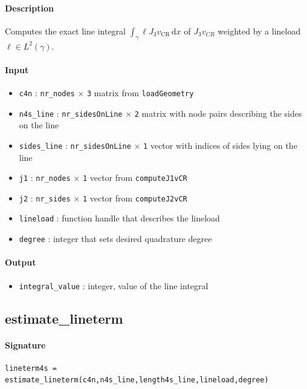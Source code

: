 \documentclass[11pt,a4paper]{article}
\newcommand{\vCR}{v_{\mathrm{CR}}}
\newcommand{\dx}{\,\mathrm{d}x}
\newcommand{\matrixdim}[2]{\texttt{#1} $\times$ \texttt{#2}}
\begin{document}
\paragraph{Description}
Computes the exact line integral \(\int_\gamma \ell J_3 \vCR \dx \) of $J_3 v_{CR}$ weighted by a lineload \(\ell \in L^2(\gamma)\).

\paragraph{Input}
\begin{itemize}
    \item \texttt{c4n} : \texttt{nr\_nodes} \(\times\) \texttt{3} matrix from \texttt{loadGeometry}
    \item \texttt{n4s\_line} : \texttt{nr\_sidesOnLine} \(\times\) \texttt{2} matrix with node pairs describing the sides on the line
    \item \texttt{sides\_line} : \matrixdim{nr\_sidesOnLine}{1} vector with indices of sides lying on the line
    \item \texttt{j1} : \matrixdim{nr\_nodes}{1} vector from \texttt{computeJ1vCR}
    \item \texttt{j2} : \matrixdim{nr\_sides}{1} vector from \texttt{computeJ2vCR}
    \item \texttt{lineload} : function handle that describes the lineload
    \item \texttt{degree} : integer that sets desired quadrature degree
\end{itemize}

\paragraph{Output}
\begin{itemize}
    \item \texttt{integral\_value} : integer, value of the line integral
\end{itemize}


\subsection{estimate\_lineterm}

\paragraph{Signature}
\begin{verbatim}
lineterm4s = estimate_lineterm(c4n,n4s_line,length4s_line,lineload,degree)
\end{verbatim}
\end{document}
